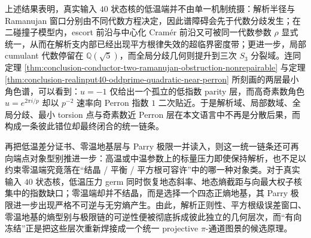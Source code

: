 







上述结果表明，真实输入 \(40\) 状态核的低温端并不由单一机制统摄：解析半径与 Ramanujan 窗口分别由不同代数方程决定，因此谱障碍会先于代数分歧发生；在二碰撞子模型内，escort 前沿与中心化 Cram\'er 前沿又可被同一代数参数 \(\rho\) 显式统一，从而在解析支内部已经出现平方根律失效的超临界密度带；更进一步，局部 cumulant 代数停留在 \(\mathbb Q(\sqrt5)\)，而全局分歧几何则提升到三次 \(S_3\) 分裂域。连同定理 \ref{thm:conclusion-conductor-two-ramanujan-obstruction-nonrepairable} 与定理 \ref{thm:conclusion-realinput40-oddprime-quadratic-near-perron} 所刻画的两层最小角色谱，可以看到：\(u=-1\) 仅给出一个孤立的低指数 parity 层，而高奇素数角色 \(u=e^{2\pi i/p}\) 却以 \(p^{-2}\) 速率向 Perron 指数 \(1\) 二次贴近。于是解析域、局部数域、全局分歧、最小 torsion 点与奇素数近 Perron 层在本文语言中不再是分散后果，而构成一条彼此错位却最终闭合的统一链条。

\noindent
再把低温差分证书、零温地基层与 Parry 极限一并读入，则这一统一链条还可再向端点对象型别推进一步：高温或中温参数上的标量压力即使保持解析，也不足以约束零温端究竟落在“结晶 / 平衡 / 平方根可容许”中的哪一种对象类。对于真实输入 \(40\) 状态核，低温压力 germ 同时恢复地态斜率、地态熵截距与向最大权子核集中的指数缺口；零温端却并不结晶，而是选择一个四态正熵地基，其 Parry 极限进一步出现严格不可逆与无穷熵产生。由此，解析正则性、平方根级误差窗口、零温地基的熵型别与极限链的可逆性便被彻底拆成彼此独立的几何层次，而“有向冻结”正是把这些层次重新焊接成一个统一 projective \(\pi\)-通道图景的候选原理。

\endinput
